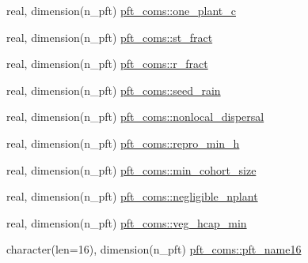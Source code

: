 \begin{DoxyCompactItemize}
\item 
real, dimension(n\+\_\+pft) \hyperlink{namespacepft__coms_a584bfab014a9ec5b4a5d7ed9e458df9f}{pft\+\_\+coms\+::one\+\_\+plant\+\_\+c}
\item 
real, dimension(n\+\_\+pft) \hyperlink{namespacepft__coms_a24d6f9401bfd2a1127dbc4b957a6d94e}{pft\+\_\+coms\+::st\+\_\+fract}
\item 
real, dimension(n\+\_\+pft) \hyperlink{namespacepft__coms_a588d74ddc11417f923b20d000e0740aa}{pft\+\_\+coms\+::r\+\_\+fract}
\item 
real, dimension(n\+\_\+pft) \hyperlink{namespacepft__coms_a9e5f0badf00a834a699115fc8974d9f2}{pft\+\_\+coms\+::seed\+\_\+rain}
\item 
real, dimension(n\+\_\+pft) \hyperlink{namespacepft__coms_ab4b143dec3e017f4e90ee99ca12bb329}{pft\+\_\+coms\+::nonlocal\+\_\+dispersal}
\item 
real, dimension(n\+\_\+pft) \hyperlink{namespacepft__coms_a30fe0a0ce90033d81e78cc82c9b70017}{pft\+\_\+coms\+::repro\+\_\+min\+\_\+h}
\item 
real, dimension(n\+\_\+pft) \hyperlink{namespacepft__coms_ae271b74cd105b2cf539a630a97cfc185}{pft\+\_\+coms\+::min\+\_\+cohort\+\_\+size}
\item 
real, dimension(n\+\_\+pft) \hyperlink{namespacepft__coms_a35da186f9b0c1860742f4496333703a7}{pft\+\_\+coms\+::negligible\+\_\+nplant}
\item 
real, dimension(n\+\_\+pft) \hyperlink{namespacepft__coms_a0bc569727ea7f49b70751189cb07d8fc}{pft\+\_\+coms\+::veg\+\_\+hcap\+\_\+min}
\item 
character(len=16), dimension(n\+\_\+pft) \hyperlink{namespacepft__coms_abbfea830303582f918e1630cb7009694}{pft\+\_\+coms\+::pft\+\_\+name16}
\end{DoxyCompactItemize}
